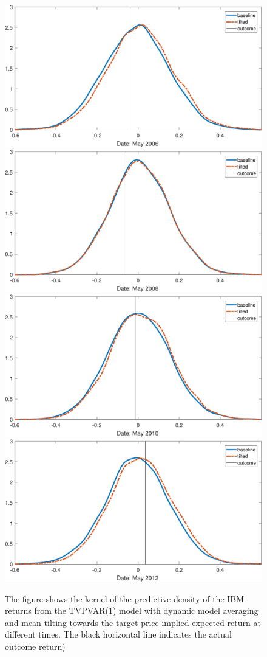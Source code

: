 \begin{figure}
	\centering
	\includegraphics[width=0.49\linewidth]{../plots/IBM_density_m1}
	\includegraphics[width=0.49\linewidth]{../plots/IBM_density_m2}\\
	\includegraphics[width=0.49\linewidth]{../plots/IBM_density_m3}
	\includegraphics[width=0.49\linewidth]{../plots/IBM_density_m4}
	\caption[Kernel estimates of predictive density of the IBM returns from the TVPVAR(1) with dynamic model averaging and tilting towards the mean of monthly target price implied expected returns]{The figure shows the kernel of the predictive density of the IBM returns from the TVPVAR(1) model with dynamic model averaging and mean tilting towards the target price implied expected return at different times. The black horizontal line indicates the actual outcome return)}
	\label{fig:ibmdensitym}
\end{figure}

